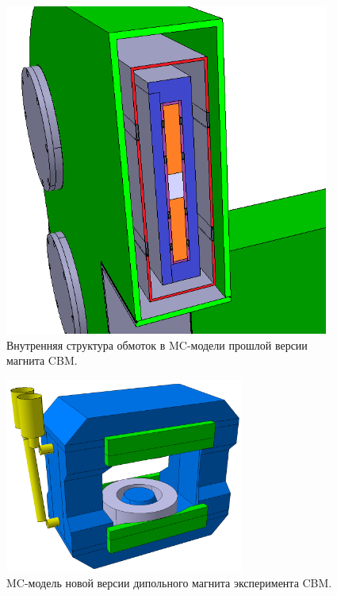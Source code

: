 \begin{figure}[H]
\begin{minipage}[b]{0.495\textwidth}
\includegraphics[width=0.95\textwidth]{pictures/Old_magnet_coils.png}
\caption{Внутренняя структура обмоток в MC-модели прошлой версии магнита CBM.}
\label{fig:OldCbmMagnet2}
\end{minipage}
\end{figure}

\begin{figure}[H]
\centering
\includegraphics[width=0.7\textwidth]{pictures/New_CBM_magnet.png}
\caption{MC-модель новой версии дипольного магнита эксперимента CBM.}
\label{fig:NewCbmMagnet1}
\end{figure}


